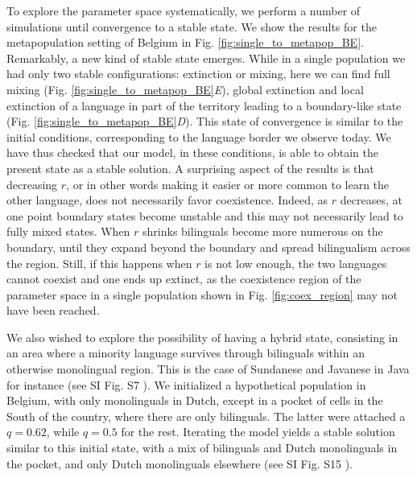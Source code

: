 \documentclass[../thesis.tex]{subfiles}
\begin{document}
To explore the parameter space systematically, we perform a number of simulations until
convergence to a stable state. We show the results for the metapopulation setting of
Belgium in Fig. \ref{fig:single_to_metapop_BE}. Remarkably, a new kind of stable state
emerges. While in a single population we had only two stable configurations: extinction
or mixing, here we can find full mixing (Fig. \ref{fig:single_to_metapop_BE}\textit{E}),
global extinction and local extinction of a language in part of the territory leading to
a boundary-like state (Fig. \ref{fig:single_to_metapop_BE}\textit{D}). This state of
convergence is similar to the initial conditions, corresponding to the language border
we observe today. We have thus checked that our model, in these conditions, is able to
obtain the present state as a stable solution. A surprising aspect of the results is
that decreasing $r$, or in other words making it easier or more common to learn the
other language, does not necessarily favor coexistence. Indeed, as $r$ decreases, at one
point boundary states become unstable and this may not necessarily lead to fully mixed
states. When $r$ shrinks bilinguals become more numerous on the boundary, until they
expand beyond the boundary and spread bilingualism across the region. Still, if this
happens when $r$ is not low enough, the two languages cannot coexist and one ends up
extinct, as the coexistence region of the parameter space in a single population shown
in Fig. \ref{fig:coex_region} may not have been reached. 

We also wished to explore the possibility of having a hybrid state, consisting in an
area where a minority language survives through bilinguals within an otherwise
monolingual region. This is the case of Sundanese and Javanese in Java for instance (see
SI Fig. S7 \cite{supp}). We initialized a hypothetical population in Belgium, with only
monolinguals in Dutch, except in a pocket of cells in the South of the country, where
there are only bilinguals. The latter were attached a $q = 0.62$, while $q = 0.5$ for
the rest. Iterating the model yields a stable solution similar to this initial state,
with a mix of bilinguals and Dutch monolinguals in the pocket, and only Dutch
monolinguals elsewhere (see SI Fig. S15 \cite{supp}).
\end{document}
